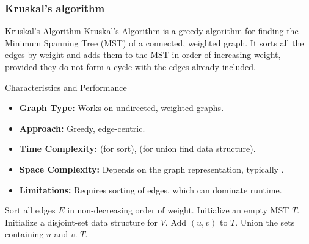 \newpage
\subsubsection{Kruskal's algorithm}
\begin{definition}[]{Kruskal's Algorithm}
    Kruskal's Algorithm is a greedy algorithm for finding the Minimum Spanning Tree (MST) of a connected, weighted graph. It sorts all the edges by weight and adds them to the MST in order of increasing weight, provided they do not form a cycle with the edges already included.
\end{definition}

\begin{properties}[]{Characteristics and Performance}
    \begin{itemize}
        \item \textbf{Graph Type:} Works on undirected, weighted graphs.
        \item \textbf{Approach:} Greedy, edge-centric.
        \item \textbf{Time Complexity:}  (for sort),  (for union find data structure).\\
              \timecomplexity {}
        \item \textbf{Space Complexity:} Depends on the graph representation, typically .
        \item \textbf{Limitations:} Requires sorting of edges, which can dominate runtime.
    \end{itemize}
\end{properties}

\begin{algorithm}
    \caption{Kruskal's Algorithm}
    \begin{algorithmic}[1]
            \State Sort all edges $E$ in non-decreasing order of weight.
            \State Initialize an empty MST $T$.
            \State Initialize a disjoint-set data structure for $V$.
                    \State Add $(u, v)$ to $T$.
                    \State Union the sets containing $u$ and $v$.
                \EndIf
            \EndFor
            \State \Return $T$.
        \EndProcedure
    \end{algorithmic}
\end{algorithm}

